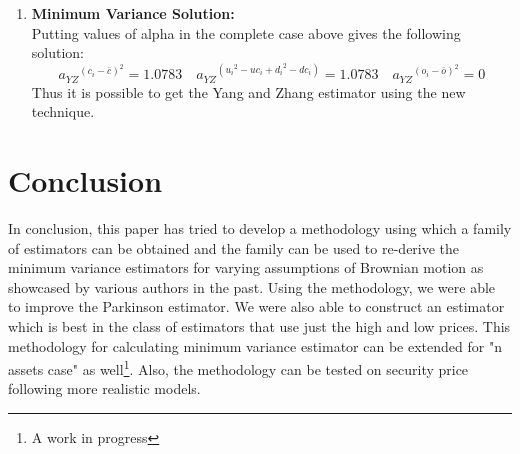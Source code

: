 \documentclass[12pt]{article}   	%
\begin{document}
\begin{enumerate}
\item \textbf{Minimum Variance Solution:}\\
Putting values of alpha in the complete case above gives the following solution:\\
$${a_{YZ}}^{(c_i-\bar{c})^2}=1.0783\quad {a_{YZ}}^{({{u_i}^2-uc_i+{d_i}^2-dc_i})}=1.0783\quad {a_{YZ}}^{(o_i-\bar{o})^2}=0$$
Thus it is possible to get the Yang and Zhang estimator using the new technique.
\end{enumerate}

\section{Conclusion}
In conclusion, this paper has tried to develop a methodology using which a family of estimators can be obtained and the family can be used to 
re-derive the minimum variance estimators for varying assumptions of Brownian motion as showcased by various authors in the past. 
Using the methodology, we were able to improve the Parkinson estimator. We were also able to construct an estimator which is best in the class of estimators that use just the high and low prices. This methodology for calculating minimum variance estimator can be extended for "n assets case" as well\footnote{A work in progress}. Also, the methodology can be tested on security price following more realistic models.\\


\medskip


\end{document}
